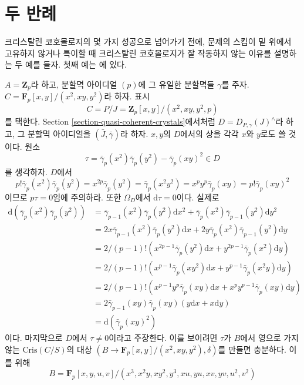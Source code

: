 \section{두 반례}
\label{section-examples}

\noindent
크리스탈린 코호몰로지의 몇 가지 성공으로 넘어가기 전에, 문제의
스킴이 밑 위에서 고유하지 않거나 특이할 때 크리스탈린
코호몰로지가 잘 작동하지 않는 이유를 설명하는 두 예를 들자.
첫째 예는 \cite{BO}에 있다.

\begin{example}
\label{example-torsion}
$A = \mathbf{Z}_p$라 하고, 분할멱 아이디얼 $(p)$에 그 유일한
분할멱들 $\gamma$를 주자.
$C = \mathbf{F}_p[x, y]/(x^2, xy, y^2)$라 하자. 표시
$$
C = P/J = \mathbf{Z}_p[x, y]/(x^2, xy, y^2, p)
$$
를 택한다. Section \ref{section-quasi-coherent-crystals}에서처럼
$D = D_{P, \gamma}(J)^\wedge$라 하고, 그 분할멱 아이디얼을
$(\bar J, \bar \gamma)$라 하자. $x, y$의 $D$에서의 상을 각각
$x$와 $y$로도 쓸 것이다. 원소
$$
\tau = \bar\gamma_p(x^2)\bar\gamma_p(y^2) - \bar\gamma_p(xy)^2 \in D
$$
를 생각하자. $D$에서
$$
p! \bar\gamma_p(x^2) \bar\gamma_p(y^2) =
x^{2p} \bar\gamma_p(y^2) = \bar\gamma_p(x^2y^2) =
x^py^p \bar\gamma_p(xy) = p! \bar\gamma_p(xy)^2
$$
이므로 $p\tau = 0$임에 주의하라. 또한 $\Omega_D$에서
$\text{d}\tau = 0$이다. 실제로
\begin{align*}
\text{d}(\bar\gamma_p(x^2) \bar\gamma_p(y^2))
& =
\bar\gamma_{p - 1}(x^2)\bar\gamma_p(y^2)\text{d}x^2 +
\bar\gamma_p(x^2)\bar\gamma_{p - 1}(y^2)\text{d}y^2 \\
& =
2 x \bar\gamma_{p - 1}(x^2)\bar\gamma_p(y^2)\text{d}x +
2 y \bar\gamma_p(x^2)\bar\gamma_{p - 1}(y^2)\text{d}y \\
& =
2/(p - 1)!( x^{2p - 1} \bar\gamma_p(y^2)\text{d}x +
y^{2p - 1} \bar\gamma_p(x^2)\text{d}y ) \\
& =
2/(p - 1)!
(x^{p - 1} \bar\gamma_p(xy^2)\text{d}x +
y^{p - 1} \bar\gamma_p(x^2y)\text{d}y) \\
& =
2/(p - 1)!
(x^{p - 1}y^p \bar\gamma_p(xy)\text{d}x +
x^py^{p - 1} \bar\gamma_p(xy)\text{d}y) \\
& =
2 \bar\gamma_{p - 1}(xy) \bar\gamma_p(xy)(y\text{d}x + x \text{d}y) \\
& =
\text{d}(\bar\gamma_p(xy)^2)
\end{align*}
이다. 마지막으로 $D$에서 $\tau \not = 0$이라고 주장한다. 이를
보이려면 $\tau$가 $B$에서 영으로 가지 않는
$\text{Cris}(C/S)$의 대상
$(B \to \mathbf{F}_p[x, y]/(x^2, xy, y^2), \delta)$를 만들면
충분하다. 이를 위해
$$
B = \mathbf{F}_p[x, y, u, v]/(x^3, x^2y, xy^2, y^3, xu, yu, xv, yv, u^2, v^2)
$$
\end{example}
